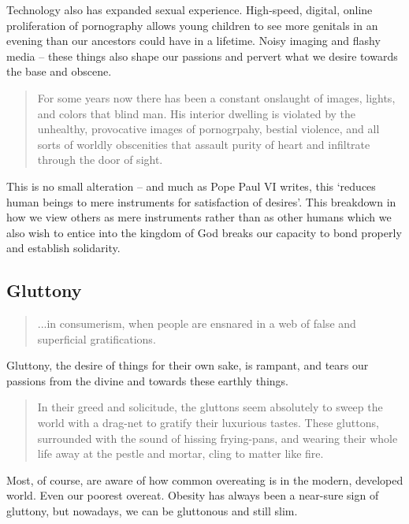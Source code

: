 \documentclass[letterpaper]{article}
\begin{document}
    Technology also has expanded sexual experience. High-speed, digital, online proliferation of pornography allows young children to see more genitals in an evening than our ancestors could have in a lifetime. Noisy imaging and flashy media -- these things also shape our passions and pervert what we desire towards the base and obscene.

    \begin{quote}
      For some years now there has been a constant onslaught of images, lights, and colors that blind man. His interior dwelling is violated by the unhealthy, provocative images of pornogrpahy, bestial violence, and all sorts of worldly obscenities that assault purity of heart and infiltrate through the door of sight.
    \end{quote}

    This is no small alteration -- and much as Pope Paul VI writes, this `reduces human beings to mere instruments for satisfaction of desires'. This breakdown in how we view others as mere instruments rather than as other humans which we also wish to entice into the kingdom of God breaks our capacity to bond properly and establish solidarity.

  \subsection{Gluttony}

    \begin{quote}
      ...in consumerism, when people are ensnared in a web of false and superficial gratifications.
    \end{quote}

    Gluttony, the desire of things for their own sake, is rampant, and tears our passions from the divine and towards these earthly things.

    \begin{quote}
      In their greed and solicitude, the gluttons seem absolutely to sweep the world with a drag-net to gratify their luxurious tastes. These gluttons, surrounded with the sound of hissing frying-pans, and wearing their whole life away at the pestle and mortar, cling to matter like fire. 
    \end{quote}

    Most, of course, are aware of how common overeating is in the modern, developed world. Even our poorest overeat. Obesity has always been a near-sure sign of gluttony, but nowadays, we can be gluttonous and still slim.
\end{document}
